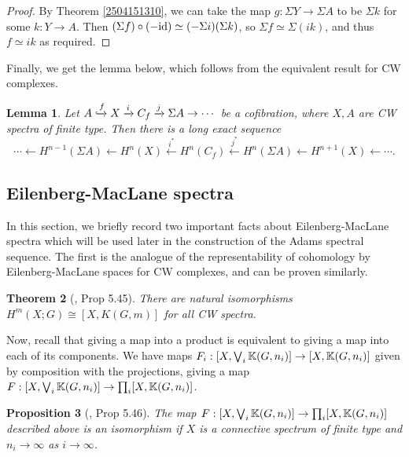 \documentclass[11pt, titlepage]{article} %
\def\bb{\ensuremath\mathbb}
\def\xinj{\ensuremath\xhookrightarrow}
\def\id{\ensuremath\text{id}}
\numberwithin{equation}{subsection}
\theoremstyle{plain}
\newtheorem{theorem}{Theorem}[subsection]
\newtheorem{lemma}[theorem]{Lemma}
\newtheorem{proposition}[theorem]{Proposition}
\theoremstyle{definition}
\begin{document}
\begin{proof}
By Theorem \ref{2504151310}, we can take the map \(g : \Sigma Y \to \Sigma A\) to be \(\Sigma k\) for some \(k : Y \to A\). Then \((\Sigma f)\circ (-\id) \simeq (-\Sigma i)(\Sigma k)\), so \(\Sigma f\simeq \Sigma(ik)\), and thus \(f \simeq ik\) as required.
\end{proof}

Finally, we get the lemma below, which follows from the equivalent result for CW complexes. 

\begin{lemma}\label{2504140954}
Let \(A \xinj f X \xrightarrow{i} C_f \xrightarrow{j} \Sigma A \to \cdots\) be a cofibration, where \(X, A\) are CW spectra of finite type. Then there is a long exact sequence 
\[\cdots \leftarrow H^{n-1}(\Sigma A) \leftarrow H^n(X) \xleftarrow{i^*} H^n(C_f) \xleftarrow{j^*} H^n(\Sigma A)\leftarrow H^{n+1}(X) \leftarrow \cdots.\]
\end{lemma}

\subsection{Eilenberg-MacLane spectra}\label{2504291245}

In this section, we briefly record two important facts about Eilenberg-MacLane spectra which will be used later in the construction of the Adams spectral sequence. The first is the analogue of the representability of cohomology by Eilenberg-MacLane spaces for CW complexes, and can be proven similarly.

\begin{theorem}[{\autocite{hatcher5}, Prop 5.45}]\label{2503221328}
There are natural isomorphisms \(H^m(X;G)\cong [X,K(G,m)]\) for all CW spectra.
\end{theorem}

Now, recall that giving a map into a product is equivalent to giving a map into each of its components. We have maps \(F_i : [X, \bigvee_i \bb{K}(G,n_i)]\to [X,\bb{K}(G,n_i)]\) given by composition with the projections, giving a map \(F : [X, \bigvee_i \bb{K}(G,n_i)]\to \prod_i [X,\bb{K}(G,n_i)]\).

\begin{proposition}[{\autocite{hatcher5}, Prop 5.46}]\label{2503231218}
The map \(F : [X, \bigvee_i \bb{K}(G,n_i)]\to \prod_i [X,\bb{K}(G,n_i)]\) described above is an isomorphism if \(X\) is a connective spectrum of finite type and \(n_i\to \infty\) as \(i\to\infty\). 
\end{proposition}
\end{document}
